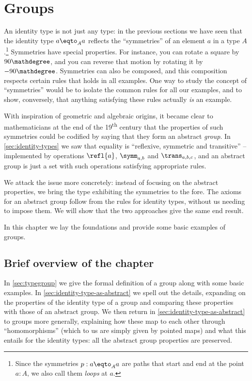 \chapter{Groups}
\label{ch:groups}


An identity type is not just any type:  in the previous sections we have seen that the identity type $a\eqto_Aa$ reflects the ``symmetries'' of an element $a$ in a type $A$.\footnote{%
  Since the symmetries $p : a\eqto_A a$ are paths that start and end
  at the point $a:A$, we also call them \emph{loops} at $a$.\par
  }
Symmetries have special properties.  For instance, you can rotate a square by $90\mathdegree$, and you can reverse that motion by rotating it by $-90\mathdegree$.
Symmetries can also be composed, and this composition respects certain rules that holds in all examples.  One way to study the concept of ``symmetries'' would be to isolate the common rules for all our examples, and to show, conversely, that anything satisfying these rules actually \emph{is} an example.



With inspiration of geometric and algebraic origins, it became clear to mathematicians at the end of the 19\textsuperscript{th} century that the properties of such symmetries could be codified by saying that they form an abstract \emph{group}.
In \cref{sec:identity-types} we saw that equality is ``reflexive, symmetric and transitive'' -- implemented by operations $\refl{a}$, $\symm_{a,b}$ and $\trans_{a,b,c}$,
and an abstract group is just a set with such operations satisfying appropriate rules.

We attack the issue more concretely:
instead of focusing on the abstract properties,
we bring the type exhibiting the symmetries to the fore.
The axioms for an abstract group follow from the rules for identity types,
without us needing to impose them.
We will show that the two approaches give the same end result.

In this chapter we lay the foundations and provide some basic examples of groups.

\section{Brief overview of the chapter}
In \cref{sec:typegroup} we give the formal definition of a group along with some basic examples.
In \cref{sec:identity-type-as-abstract} we spell out the details, expanding on the properties of the identity type of a group and comparing these properties with those of an abstract group.  We then return in \cref {sec:identity-type-as-abstract} to groups more generally, explaining how these map to each other through ``homomorphisms'' (which to us are simply given by pointed maps) and what this entails for the identity types: all the abstract group properties are preserved.


